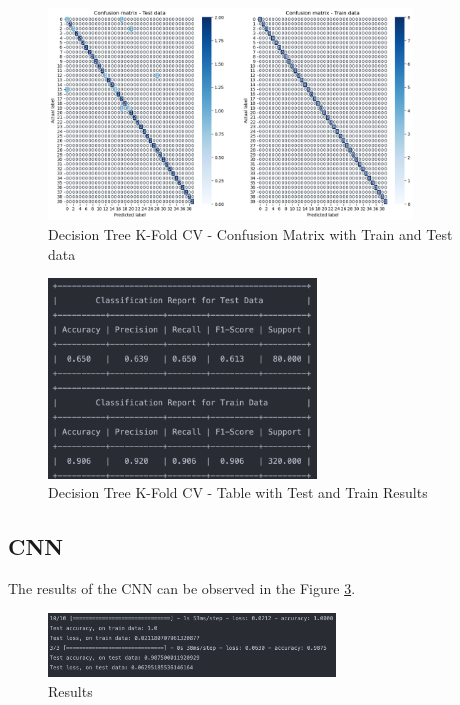\documentclass[conference]{IEEEtran}
\begin{document}
\begin{figure}[H]
    \centering
    \includegraphics[width=3.8in]{DT/3.png}%
    \caption{Decision Tree K-Fold CV - Confusion Matrix with Train and Test data}%
    \label{fig:conf_dt_3}%
\end{figure}

\begin{figure}[H]
    \centering
    \includegraphics[width=2.8in]{DT/Screenshot 2023-01-21 at 01.15.42.png}%
    \caption{Decision Tree K-Fold CV - Table with Test and Train Results}%
    \label{fig:conf_dt_r_3}%
\end{figure}

\subsection{CNN}
The results of the CNN can be observed in the Figure \ref{fig:results_cnn}.

\begin{figure}
    \centering
    \includegraphics[width=3in]{cnn/Screenshot 2023-01-21 at 02.04.01.png}
    \caption{Results}
    \label{fig:results_cnn}
\end{figure}
\end{document}
